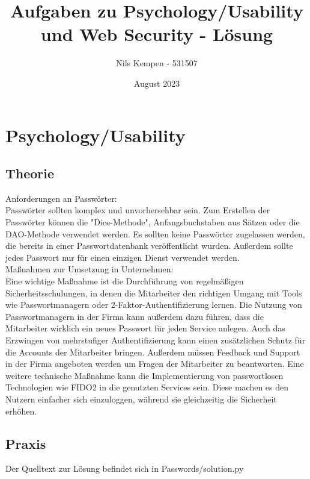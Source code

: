 \documentclass[ngerman]{article}
\title{Aufgaben zu Psychology/Usability und Web Security - Lösung}
\author{Nils Kempen - 531507}
\date{August 2023}
\begin{document}
\maketitle


\section{Psychology/Usability}

\subsection{Theorie}
Anforderungen an Passwörter:\\ 
Passwörter sollten komplex und unvorhersehbar sein. Zum Erstellen der Passwörter können die "Dice-Methode", Anfangsbuchstaben aus Sätzen oder die DAO-Methode verwendet werden.
Es sollten keine Passwörter zugelassen werden, die bereits in einer Passwortdatenbank veröffentlicht wurden.
Außerdem sollte jedes Passwort nur für einen einzigen Dienst verwendet werden.\\

\noindent Maßnahmen zur Umsetzung in Unternehmen:\\
Eine wichtige Maßnahme ist die Durchführung von regelmäßigen Sicherheitsschulungen, in denen die Mitarbeiter den richtigen Umgang mit Tools wie Passwortmanagern oder 2-Faktor-Authentifizierung lernen.
Die Nutzung von Passwortmanagern in der Firma kann außerdem dazu führen, dass die Mitarbeiter wirklich ein neues Passwort für jeden Service anlegen. Auch das Erzwingen von mehrstufiger Authentifizierung kann einen zusätzlichen Schutz für die Accounts der Mitarbeiter bringen.
Außerdem müssen Feedback und Support in der Firma angeboten werden um Fragen der Mitarbeiter zu beantworten.
Eine weitere technische Maßnahme kann die Implementierung von passwortlosen Technologien wie FIDO2 in die genutzten Services sein. Diese machen es den Nutzern einfacher sich einzuloggen, während sie gleichzeitig die Sicherheit erhöhen. 


\subsection{Praxis}
Der Quelltext zur Lösung befindet sich in Passwords/solution.py
\end{document}
